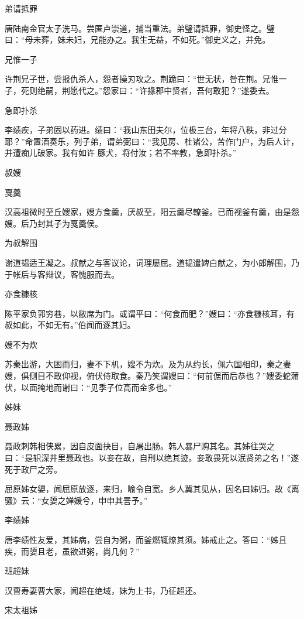 \documentclass[a4paper,12pt,UTF8,twoside]{ctexbook}
\begin{document}
    弟请抵罪
    
    唐陆南金官太子洗马。尝匿卢崇道，捕当重法。弟璧请抵罪，御史怪之。璧曰：“母未葬，妹未妇，兄能办之。我生无益，不如死。”御史义之，并免。
    
    兄惟一子
    
    许荆兄子世，尝报仇杀人，怨者操刃攻之。荆跪曰：“世无状，咎在荆。兄惟一子，死则绝嗣，荆愿代之。”怨家曰：“许掾郡中贤者，吾何敢犯？”遂委去。
    
    急即扑杀
    
    李绩疾，子弟固以药进。绩曰：“我山东田夫尔，位极三台，年将八秩，非过分耶？”命置酒奏乐，列子弟，谓弟弼曰：“我见房、杜诸公，苦作门户，为后人计，并遭痴儿破家。我有如许 豚犬，将付汝；若不率教，急即扑杀。”
    
    叔嫂
    
    戛羹
    
    汉高祖微时至丘嫂家，嫂方食羹，厌叔至，阳云羹尽轑釜。已而视釜有羹，由是怨嫂。后乃封其子为戛羹侯。
    
    为叔解围
    
    谢道韫适王凝之。叔献之与客议论，词理屡屈。道韫遣婢白献之，为小郎解围，乃于帐后与客辩议，客愧服而去。
    
    亦食糠核
    
    陈平家负郭穷巷，以敝席为门。或谓平曰：“何食而肥？”嫂曰：“亦食糠核耳，有叔如此，不如无有。”伯闻而逐其妇。
    
    嫂不为炊
    
    苏秦出游，大困而归，妻不下机，嫂不为炊。及为从约长，佩六国相印，秦之妻嫂，俱侧目不敢仰视，俯伏侍取食。秦乃笑谓嫂曰：“何前倨而后恭也？”嫂委蛇蒲伏，以面掩地而谢曰：“见季子位高而金多也。”
    
    姊妹
    
    聂政姊
    
    聂政刺韩相侠累，因自皮面抉目，自屠出肠。韩人暴尸购其名。其姊往哭之曰：“是轵深井里聂政也。以妾在故，自刑以绝其迹。妾敢畏死以泯贤弟之名！”遂死于政尸之旁。
    
    屈原姊女嬃，闻屈原放逐，来归，喻令自宽。乡人冀其见从，因名曰姊归。故《离骚》云：“女嬃之婵媛兮，申申其詈予。”
    
    李绩姊
    
    唐李绩性友爱，其姊病，尝自为粥，而釜燃辄燎其须。姊戒止之。答曰：“姊且疾，而嬃且老，虽欲进粥，尚几何？”
    
    班超妹
    
    汉曹寿妻曹大家，闻超在绝域，妹为上书，乃征超还。
    
    宋太祖姊
    
\end{document}
